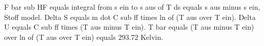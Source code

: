 F bar sub HF equals integral from s ein to s aus of T ds equals s aus minus s ein, Stoff model. Delta S equals m dot C sub ff times ln of (T aus over T ein). Delta U equals C sub ff times (T aus minus T ein). T bar equals (T aus minus T ein) over ln of (T aus over T ein) equals 293.72 Kelvin.